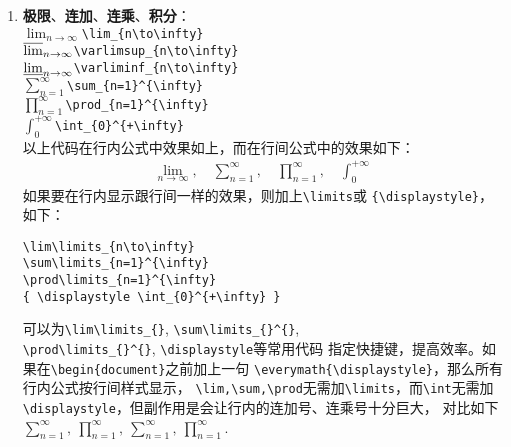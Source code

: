 \documentclass{article}
\newcommand{\q}{\quad}
\begin{document}
\begin{multicols}{2}
\begin{enumerate}
        \item \textbf{极限}、\textbf{连加}、\textbf{连乘}、\textbf{积分}：\\
              $ \lim_{n\to\infty} $\q \verb|\lim_{n\to\infty}| \\
              $ \varlimsup_{n\to\infty} $\q \verb|\varlimsup_{n\to\infty}| \\
              $ \varliminf_{n\to\infty} $\q \verb|\varliminf_{n\to\infty}| \\
              $ \sum_{n=1}^{\infty} $\q\q \verb|\sum_{n=1}^{\infty}| \\
              $ \prod_{n=1}^{\infty} $\q\q \verb|\prod_{n=1}^{\infty}| \\
              $ \int_{0}^{+\infty} $\q\q\q \verb|\int_{0}^{+\infty}| \\
              以上代码在行内公式中效果如上，而在行间公式中的效果如下：
              \begin{gather*}
                  \lim_{n\to\infty},\q \sum_{n=1}^{\infty},\q
                  \prod_{n=1}^{\infty},\q \int_{0}^{+\infty}
              \end{gather*}
              如果要在行内显示跟行间一样的效果，则加上\verb|\limits|或
              \verb|{\displaystyle}|，如下：
              \begin{lstlisting}
\lim\limits_{n\to\infty}
\sum\limits_{n=1}^{\infty}
\prod\limits_{n=1}^{\infty}
{ \displaystyle \int_{0}^{+\infty} }
\end{lstlisting}
              可以为\verb|\lim\limits_{}|, \verb|\sum\limits_{}^{}|,\\
              \verb|\prod\limits_{}^{}|, \verb|\displaystyle|等常用代码
              指定快捷键，提高效率。如果在\verb|\begin{document}|之前加上一句
              \verb|\everymath{\displaystyle}|，那么所有行内公式按行间样式显示，
              \verb|\lim,\sum,\prod|无需加\verb|\limits|，而\verb|\int|无需加
              \verb|\displaystyle|，但副作用是会让行内的连加号、连乘号十分巨大，
              对比如下$ \sum\limits_{n=1}^{\infty},\
                  \prod\limits_{n=1}^{\infty},\ { \displaystyle
                  \sum_{n=1}^{\infty},\ \prod_{n=1}^{\infty} } $.


\end{enumerate}
\end{multicols}
\end{document}
